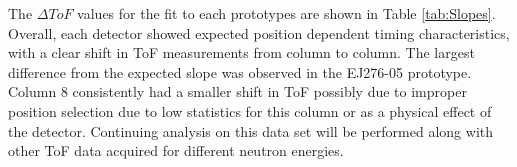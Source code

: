 \begin{comment}
  The last column in each prototype had significantly less shift than all other columns, so a fit was also performed to columns 1 to 7 as well to observe the effect of column 8 on the overall time-of-flight propagation.
\end{comment}
The $\Delta ToF$ values for the fit to each prototypes are shown in Table \ref{tab:Slopes}. Overall, each detector showed expected position dependent timing characteristics, with a clear shift in ToF measurements from column to column. The largest difference from the expected slope was observed in the EJ276-05 prototype.
Column 8 consistently had a smaller shift in ToF possibly due to improper position selection due to low statistics for this column or as a physical effect of the detector.
Continuing analysis on this data set will be performed along with other ToF data acquired for different neutron energies.

